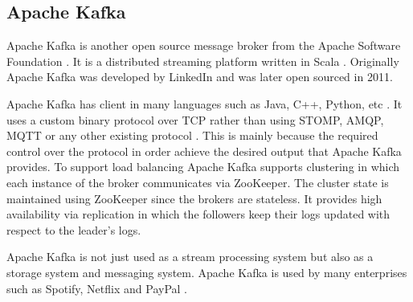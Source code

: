 \subsection{Apache Kafka}

Apache Kafka is another open source message broker from the Apache Software Foundation \parencite{thein2014apache}. It is a distributed streaming platform written in Scala \parencite{kafka_official_site}. Originally Apache Kafka was developed by LinkedIn and was later open sourced in 2011. 

Apache Kafka has client in many languages such as Java, C++, Python, etc \parencite{kafka_official_wiki}.
It uses a custom binary protocol over TCP rather than using STOMP, AMQP, MQTT or any other existing protocol \parencite{kafka_protocol}. This is mainly because the required control over the protocol in order achieve the desired output that Apache Kafka provides. To support load balancing Apache Kafka supports clustering \parencite{garg2013apache} in which each instance of the broker communicates via ZooKeeper. The cluster state is maintained using ZooKeeper since the brokers are stateless. It provides high availability via replication in which the followers keep their logs updated with respect to the leader's logs. 

Apache Kafka is not just used as a stream processing system but also as a storage system and messaging system. Apache Kafka is used by many enterprises such as Spotify, Netflix and PayPal \parencite{kafka_users}.